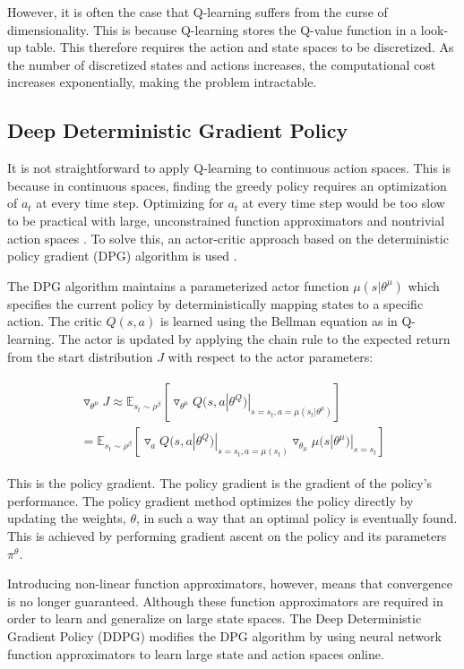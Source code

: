 \documentclass[conference]{IEEEtran}
\begin{document}
However, it is often the case that Q-learning suffers from the curse of dimensionality. This is because Q-learning stores the Q-value function in a look-up table. This therefore requires the action and state spaces to be discretized. As the number of discretized states and actions increases, the computational cost increases exponentially, making the problem intractable. 

\subsection{Deep Deterministic Gradient Policy}


It is not straightforward to apply Q-learning to continuous action spaces. This is because in continuous spaces, finding the greedy policy requires an optimization of $a_t$ at every time step. Optimizing for $a_t$ at every time step would be too slow to be practical with large, unconstrained function approximators and nontrivial action spaces \cite{hunt2016a}. To solve this, an actor-critic approach based on the deterministic policy gradient (DPG) algorithm is used \cite{Silver2014}.


The DPG algorithm maintains a parameterized actor function $\mu(s|\theta^\mu)$ which specifies the current policy by deterministically mapping states to a specific action. The critic $Q(s,a)$ is learned using the Bellman equation as in Q-learning. The actor is updated by applying the chain rule to the expected return from the start distribution $J$ with respect to the actor parameters:

\begin{align}
\begin{split}
	\triangledown_{\theta^\mu}J\approx\mathbb{E}_{s_t\sim\rho^\beta}[\triangledown_{\theta^\mu}Q(s,a|\theta^Q)|_{s=s_t,a=\mu(s_t|\theta^\mu)}] \\
	= \mathbb{E}_{s_t\sim\rho^\beta}[\triangledown_aQ(s,a|\theta^Q)|_{s=s_t,a=\mu(s_t)}\triangledown_{\theta_\mu}\mu(s|\theta^\mu)|_{s=s_t}]
\end{split}
\end{align}
  
This is the policy gradient. The policy gradient is the gradient of the policy's performance. The policy gradient method optimizes the policy directly by updating the weights, $\theta$, in such a way that an optimal policy is eventually found. This is achieved by performing gradient ascent on the policy and its parameters $\pi^\theta$.

Introducing non-linear function approximators, however, means that convergence is no longer guaranteed. Although these function approximators are required in order to learn and generalize on large state spaces. The Deep Deterministic Gradient Policy (DDPG) modifies the DPG algorithm by using neural network function approximators to learn large state and action spaces online.
\end{document}
